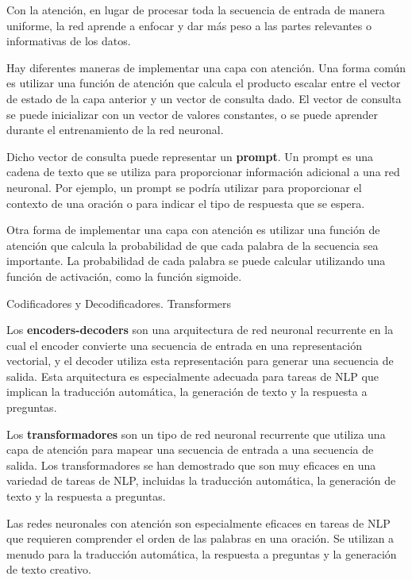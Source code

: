 \documentclass[10pd,hyperref={colorlinks=true}]{beamer}
\begin{document}
 \begin{frame}{}

Con la atención, en lugar de procesar toda la secuencia de entrada de 
manera uniforme, la red aprende a enfocar y dar más peso a las partes 
relevantes o informativas de los datos.

Hay diferentes maneras de implementar una capa con atención. Una forma 
común es utilizar una función de atención que calcula el producto 
escalar entre el vector de estado de la capa anterior y un vector de 
consulta dado. El vector de consulta se puede inicializar con un vector 
de valores constantes, o se puede aprender durante el entrenamiento de 
la red neuronal.

Dicho vector de consulta puede representar un {\bf prompt}. Un prompt es una 
cadena de texto que se utiliza para proporcionar información adicional a 
una red neuronal. Por ejemplo, un prompt se podría utilizar para 
proporcionar el contexto de una oración o para indicar el tipo de 
respuesta que se espera.

Otra forma de implementar una capa con atención es utilizar una función 
de atención que calcula la probabilidad de que cada palabra de la 
secuencia sea importante. La probabilidad de cada palabra se puede 
calcular utilizando una función de activación, como la función sigmoide.

 \end{frame}


 \begin{frame}{Codificadores y Decodificadores. Transformers}

Los {\bf encoders-decoders} son una arquitectura de red neuronal recurrente en 
la cual el encoder convierte una secuencia de entrada en una 
representación vectorial, y el decoder utiliza esta representación para 
generar una secuencia de salida. Esta arquitectura es especialmente 
adecuada para tareas de NLP que implican la traducción automática, la 
generación de texto y la respuesta a preguntas.

Los {\bf transformadores} son un tipo de red neuronal recurrente que utiliza 
una capa de atención para mapear una secuencia de entrada a una 
secuencia de salida. Los transformadores se han demostrado que son muy 
eficaces en una variedad de tareas de NLP, incluidas la traducción 
automática, la generación de texto y la respuesta a preguntas.

Las redes neuronales con atención son especialmente eficaces en tareas 
de NLP que requieren comprender el orden de las palabras en una oración. 
Se utilizan a menudo para la traducción automática, la respuesta a 
preguntas y la generación de texto creativo.

 \end{frame}
\end{document}
